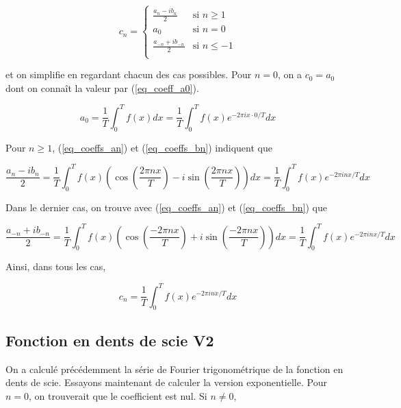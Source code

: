 \begin{equation*}
    c_n = \begin{cases}
        \frac{a_n - ib_n}{2} & \text{si } n\geq 1\\
        a_0 & \text{si } n=0\\
        \frac{a_{-n} + ib_{-n}}{2} & \text{si } n\leq -1\\
    \end{cases}
\end{equation*}

et on simplifie en regardant chacun des cas possibles. Pour $n=0$, on a $c_0 = a_0$ dont on connaît la valeur par (\ref{eq_coeff_a0}). 

\begin{equation*}
    a_0 = \frac{1}{T}\int_{0}^{T}f(x)dx = \frac{1}{T}\int_{0}^{T}f(x)e^{-2\pi i x \cdot 0/T}dx
\end{equation*}

Pour $n\geq 1$, (\ref{eq_coeffs_an}) et (\ref{eq_coeffs_bn}) indiquent que 

\begin{equation*}
    \frac{a_n - ib_n}{2} = \frac{1}{T}\int_{0}^{T}f(x)\left(\cos(\frac{2\pi nx}{T}) - i\sin(\frac{2\pi nx}{T})\right)dx = \frac{1}{T}\int_{0}^{T}f(x)e^{-2\pi inx/T}dx
\end{equation*}

Dans le dernier cas, on trouve avec (\ref{eq_coeffs_an}) et (\ref{eq_coeffs_bn}) que 

\begin{equation*}
    \frac{a_{-n} + ib_{-n}}{2} = \frac{1}{T}\int_{0}^{T}f(x)\left(\cos(\frac{-2\pi nx}{T}) + i\sin(\frac{-2\pi nx}{T})\right)dx = \frac{1}{T}\int_{0}^{T}f(x)e^{-2\pi inx/T}dx
\end{equation*}

Ainsi, dans tous les cas,

\begin{equation}
    c_n = \frac{1}{T}\int_{0}^{T}f(x)e^{-2\pi inx/T}dx
    \label{eq_coeffs_cn}
\end{equation}

\subsection{Fonction en dents de scie V2}
On a calculé précédemment la série de Fourier trigonométrique de la fonction en dents de scie. Essayons maintenant de calculer la version exponentielle. Pour $n=0$, on trouverait que le coefficient est nul. Si $n \neq 0$,  

